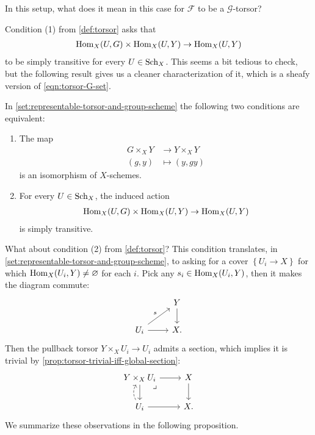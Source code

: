 \documentclass[11pt]{amsart}
\begin{document}
In this setup, what does it mean in this case for $\mathcal{F}$ to be a $\mathcal{G}$-torsor?

Condition (1) from \autoref{def:torsor} asks that
\begin{align*}
    \mathrm{Hom}_X(U,G) \times \mathrm{Hom}_X(U,Y) \to \mathrm{Hom}_X(U,Y)
\end{align*}
to be simply transitive for every $U\in \mathrm{Sch}_X$. This seems a bit tedious to check, but the following result gives us a cleaner characterization of it, which is a sheafy version of \autoref{eqn:torsor-G-set}.

\begin{proposition} \cite[0499]{Stacks} In \autoref{set:representable-torsor-and-group-scheme} the following two conditions are equivalent:
\begin{enumerate}
    \item The map
    \begin{align*}
        G \times_X Y &\to Y \times_X Y \\
        (g,y) &\mapsto (y,gy)
    \end{align*}
    is an isomorphism of $X$-schemes.
    
    \item For every $U \in \mathrm{Sch}_X$, the induced action
    \begin{align*}
        \mathrm{Hom}_X(U,G) \times \mathrm{Hom}_X(U,Y) \to \mathrm{Hom}_X(U,Y)
    \end{align*}
    is simply transitive.
\end{enumerate}
\end{proposition}

What about condition (2) from \autoref{def:torsor}? This condition translates, in \autoref{set:representable-torsor-and-group-scheme}, to asking for a cover $\left\{ U_i \to X \right\}$ for which $\mathrm{Hom}_X(U_i,Y)\ne \varnothing$ for each $i$. Pick any $s_i \in \mathrm{Hom}_X(U_i,Y)$, then it makes the diagram commute:
\[ \begin{tikzcd}
     & Y\dar\\
    U_i\rar\ar[ur,"s" above left] & X.
\end{tikzcd} \]
Then the pullback torsor $Y \times_X U_i \to U_i$ admits a section, which implies it is trivial by \autoref{prop:torsor-trivial-iff-global-section}:
\[ \begin{tikzcd}
    Y\times_X U_i\dar\rar\pb & X\dar\\
    U_i\rar\uar[dashed,bend left=30] & X.
\end{tikzcd} \]
%
We summarize these observations in the following proposition.
\end{document}
